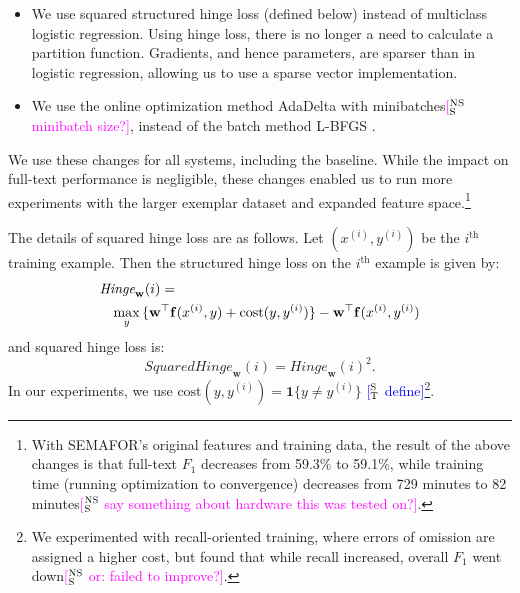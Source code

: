 \documentclass[11pt,a4paper]{article}
\newcommand{\indicator}[1]{\boldsymbol{1}\{#1\}}
\newcommand{\ensuretext}[1]{#1}
\newcommand{\nssmarker}{\ensuretext{\textcolor{magenta}{\ensuremath{^{\textsc{NS}}_{\textsc{S}}}}}}
\newcommand{\mkmarker}{\ensuretext{\textcolor{mdgreen}{\ensuremath{^{\textsc{M}}_{\textsc{K}}}}}}
\newcommand{\stmarker}{\ensuretext{\textcolor{blue}{\ensuremath{^{\textsc{S}}_{\textsc{T}}}}}}
\newcommand{\arkcomment}[3]{\ensuretext{\textcolor{#3}{[#1 #2]}}}
\newcommand{\nss}[1]{\arkcomment{\nssmarker}{#1}{magenta}}
\newcommand{\mk}[1]{\arkcomment{\mkmarker}{#1}{mdgreen}}
\newcommand{\st}[1]{\arkcomment{\stmarker}{#1}{blue}}
\begin{document}
\begin{itemize}
  \item We use squared structured hinge loss (defined below) instead of multiclass logistic regression.
  Using hinge loss, there is no longer a need to calculate a partition function.
  Gradients, and hence parameters, are sparser than in logistic regression, allowing us to use a sparse vector implementation.
  \item We use the online optimization method AdaDelta \citep{zeiler-12} with minibatches\nss{minibatch size?}, instead of the batch method L-BFGS \citep{liu-89}.
\end{itemize}
We use these changes for all systems, including the baseline.
While the impact on full-text performance is negligible, 
these changes enabled us to run more experiments with the larger exemplar dataset and expanded feature space.\footnote{With SEMAFOR's original features and training data, 
the result of the above changes is that full-text $F_1$ decreases from 59.3\% to 59.1\%, 
while training time (running optimization to convergence) 
decreases from 729 minutes to 82 minutes\nss{say something about hardware this was tested on?}.%
} 


The details of squared hinge loss are as follows.
Let $(x^{(i)}, y^{(i)})$ be the $i^{\text{th}}$ training example.
Then the structured hinge loss on the $i^{\text{th}}$ example is given by:
\begin{equation}
\begin{align*}
\lefteqn{\textit{Hinge}_\mathbf{w}(i) =} \\
&&\max_y{\{\mathbf{w}^\top \mathbf{f}(x^{(i)}, y) + \text{cost}(y, y^{(i)})\}} - \mathbf{w}^\top \mathbf{f}(x^{(i)}, y^{(i)})
\end{align*}
\end{equation}
and squared hinge loss is:
\begin{equation}
\textit{SquaredHinge}_\mathbf{w}(i) =
\textit{Hinge}_\mathbf{w}(i)^2.
\end{equation}
In our experiments, we use $\text{cost}(y, y^{(i)}) = \indicator{y \ne y^{(i)}}$ \st{define}\footnote{We experimented with recall-oriented training, where errors of omission are assigned a higher cost, but found that while recall increased, overall $F_1$ went down\nss{or: failed to improve?}.}.
\end{document}
